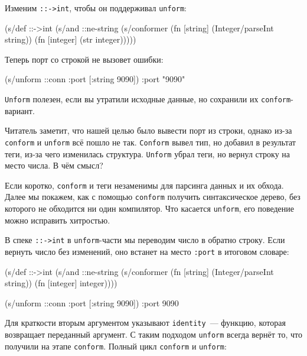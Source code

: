 Изменим \verb|::->int|, чтобы он поддерживал \verb|unform|:

\begin{english}
  \begin{clojure}
(s/def ::->int
  (s/and
   ::ne-string
   (s/conformer
    (fn [string]
      (Integer/parseInt string))
    (fn [integer]
      (str integer)))))
  \end{clojure}
\end{english}

\noindent
Теперь порт со строкой не вызовет ошибки:

\begin{english}
  \begin{clojure}
(s/unform ::conn {:port [:string 9090]})
{:port "9090"}
  \end{clojure}
\end{english}

\verb|Unform| полезен, если вы утратили исходные данные, но сохранили их
\verb|conform|-вариант.

Читатель заметит, что нашей целью было вывести порт из строки, однако из-за
\verb|conform| и \verb|unform| всё пошло не так. \verb|Conform| вывел тип,
но добавил в результат теги, из-за чего изменилась структура. \verb|Unform|
убрал теги, но вернул строку на место числа. В чём смысл?

Если коротко, \verb|conform| и теги незаменимы для парсинга данных и их
обхода. Далее мы покажем, как с помощью \verb|conform| получить синтаксическое
дерево, без которого не обходится ни один компилятор. Что касается
\verb|unform|, его поведение можно исправить хитростью.

В спеке \verb|::->int| в \verb|unform|-части мы переводим число в обратно
строку. Если вернуть число без изменений, оно встанет на место \verb|:port| в
итоговом словаре:

\begin{english}
  \begin{clojure}
(s/def ::->int
  (s/and
   ::ne-string
   (s/conformer
    (fn [string]
      (Integer/parseInt string))
    (fn [integer]
      integer))))

(s/unform ::conn {:port [:string 9090]})
{:port 9090}
  \end{clojure}
\end{english}


Для краткости вторым аргументом указывают \verb|identity|~--- функцию, которая
возвращает переданный аргумент. С таким подходом \verb|unform| всегда
вернёт то, что получили на этапе \verb|conform|. Полный цикл
\verb|conform| и \verb|unform|:

